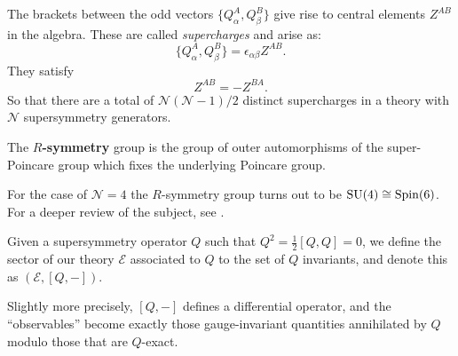	The brackets between the odd vectors $\{Q^A_\alpha, Q^B_\beta \} $ give rise to  central elements $Z^{AB}$ in the algebra. These are called \emph{supercharges} and arise as:
	$$\{Q^A_\alpha, Q^B_\beta \} = \epsilon_{\alpha \beta} Z^{AB}.$$
	They satisfy
	$$Z^{AB} = -Z^{BA}.$$
	So that there are a total of $\mathcal N (\mathcal N - 1)/2$ distinct supercharges in a theory with $\mathcal N$ supersymmetry generators. 
	
	\begin{defn}
		The \textbf{$R$-symmetry} group is the group of outer automorphisms of the super-Poincare group which fixes the underlying Poincare group. 
	\end{defn}
	For the case of $\mathcal N = 4$ the $R$-symmetry group turns out to be $\mathrm{SU}(4) \cong \mathrm{Spin}(6)$. For a deeper review of the subject, see \cite{quevedo2010}.
	
	\begin{phys}[Sector]
		Given a supersymmetry operator $Q$ such that $Q^2 = \frac{1}{2} [Q, Q] = 0$, we define the sector of our theory $\mathcal E$ associated to $Q$ to the set of $Q$ invariants, and denote this as $(\mathcal E, [Q, -])$.
		
		Slightly more precisely, $[Q, -]$ defines a differential operator, and the ``observables'' become exactly those gauge-invariant quantities annihilated by $Q$ modulo those that are $Q$-exact.
	\end{phys}

	
